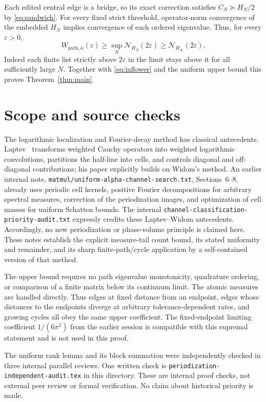 \documentclass[11pt]{article}
\newcommand{\N}{\mathcal N}
\begin{document}
Each edited central edge is a bridge, so its exact correction satisfies
$C_N\succeq H_N/2$ by \eqref{eq:sandwich}.
For every fixed strict threshold, operator-norm convergence of the
embedded $H_N$ implies convergence of each ordered eigenvalue.
Thus, for every $\varepsilon>0$,
\[
 W_{\mathrm{path},\alpha}(\varepsilon)
 \ge\sup_N\N_{H_N}(2\varepsilon)
 \ge\N_{H_\infty}(2\varepsilon).
\]
Indeed each finite list strictly above $2\varepsilon$ in the limit
stays above it for all sufficiently large $N$.
Together with \eqref{eq:inflower} and the uniform upper bound this
proves Theorem~\ref{thm:main}.

\section{Scope and source checks}
The logarithmic localization and Fourier-decay method has classical
antecedents. Laptev~\cite[Sections 3--4]{Laptev} transforms weighted
Cauchy operators into weighted logarithmic convolutions, partitions
the half-line into cells, and controls diagonal and off-diagonal
contributions; his paper explicitly builds on Widom's method.
An earlier internal note,
\nolinkurl{matmul/uniform-alpha-channel-search.txt}, Sections~6--8,
already uses periodic cell kernels, positive Fourier decompositions
for arbitrary spectral measures, correction of the periodization
images, and optimization of cell masses for uniform Schatten bounds.
The internal \nolinkurl{channel-classification-priority-audit.txt}
expressly credits these Laptev--Widom antecedents.
Accordingly, no new periodization or phase-volume principle is claimed
here. These notes establish the explicit measure-tail count bound,
its stated uniformity and remainder, and its sharp finite-path/cycle
application by a self-contained version of that method.

The upper bound requires no path eigenvalue monotonicity, quadrature
ordering, or comparison of a finite matrix below its continuum limit.
The atomic measures are handled directly. Thus edges at fixed distance
from an endpoint, edges whose distances to the endpoints diverge at
arbitrary tolerance-dependent rates, and growing cycles all obey the
same upper coefficient. The fixed-endpoint limiting coefficient
$1/(6\pi^2)$ from the earlier session is compatible with this supremal
statement and is not used in this proof.

The uniform rank lemma and its block summation were independently
checked in three internal parallel reviews. One written check is
\texttt{periodization-independent-audit.tex} in this directory.
These are internal proof checks, not external peer review or formal
verification. No claim about historical priority is made.
\end{document}
